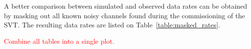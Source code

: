 A better comparison between simulated and observed data rates can be obtained
by masking out all known noisy channels found during the commissioning of the 
SVT.  The resulting data rates are listed on Table~\ref{table:masked_rates}. 
\begin{table}[h]
    \caption{Comparison of occupancy, event size and resulting data rate for each of the three 
             converter thicknesses used in the test run after all bad channels are masked.}
    \label{table:masked_rates}
\end{table}    
\textcolor{red}{Combine all tables into a single plot.}
